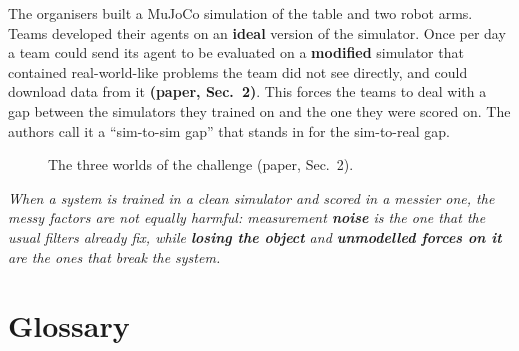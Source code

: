 \documentclass[11pt,a4paper]{article}
\begin{document}
The organisers built a MuJoCo simulation of the table and two robot arms. Teams developed their
agents on an \textbf{ideal} version of the simulator. Once per day a team could send its agent to
be evaluated on a \textbf{modified} simulator that contained real-world-like problems the team did
not see directly, and could download data from it \textbf{(paper, Sec.~2)}. This forces the teams
to deal with a gap between the simulators they trained on and the one they were scored on. The
authors call it a ``sim-to-sim gap'' that stands in for the sim-to-real gap.

\begin{figure}[H]
\centering
{}
\caption{The three worlds of the challenge (paper, Sec.~2).}
\end{figure}

\begin{idea}
\emph{When a system is trained in a clean simulator and scored in a messier one, the messy
factors are not equally harmful: measurement \textbf{noise} is the one that the usual filters
already fix, while \textbf{losing the object} and \textbf{unmodelled forces on it} are the ones
that break the system.}
\end{idea}

\section{Glossary}
\end{document}
